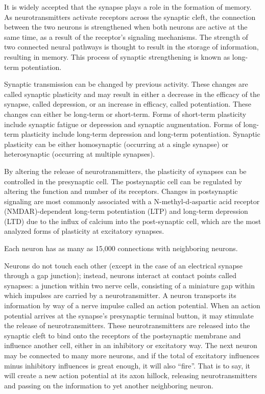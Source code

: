 \documentclass[]{book}
\begin{document}
It is widely accepted that the synapse plays a role in the formation of memory. As neurotransmitters activate receptors across the synaptic cleft, the connection between the two neurons is strengthened when both neurons are active at the same time, as a result of the receptor's signaling mechanisms. The strength of two connected neural pathways is thought to result in the storage of information, resulting in memory. This process of synaptic strengthening is known as long-term potentiation.

Synaptic transmission can be changed by previous activity. These changes are called synaptic plasticity and may result in either a decrease in the efficacy of the synapse, called depression, or an increase in efficacy, called potentiation. These changes can either be long-term or short-term. Forms of short-term plasticity include synaptic fatigue or depression and synaptic augmentation. Forms of long-term plasticity include long-term depression and long-term potentiation. Synaptic plasticity can be either homosynaptic (occurring at a single synapse) or heterosynaptic (occurring at multiple synapses).

By altering the release of neurotransmitters, the plasticity of synapses can be controlled in the presynaptic cell. The postsynaptic cell can be regulated by altering the function and number of its receptors. Changes in postsynaptic signaling are most commonly associated with a N-methyl-d-aspartic acid receptor (NMDAR)-dependent long-term potentiation (LTP) and long-term depression (LTD) due to the influx of calcium into the post-synaptic cell, which are the most analyzed forms of plasticity at excitatory synapses.

Each neuron has as many as 15,000 connections with neighboring neurons.

Neurons do not touch each other (except in the case of an electrical synapse through a gap junction); instead, neurons interact at contact points called synapses: a junction within two nerve cells, consisting of a miniature gap within which impulses are carried by a neurotransmitter. A neuron transports its information by way of a nerve impulse called an action potential. When an action potential arrives at the synapse's presynaptic terminal button, it may stimulate the release of neurotransmitters. These neurotransmitters are released into the synaptic cleft to bind onto the receptors of the postsynaptic membrane and influence another cell, either in an inhibitory or excitatory way. The next neuron may be connected to many more neurons, and if the total of excitatory influences minus inhibitory influences is great enough, it will also ``fire''. That is to say, it will create a new action potential at its axon hillock, releasing neurotransmitters and passing on the information to yet another neighboring neuron.
\end{document}
